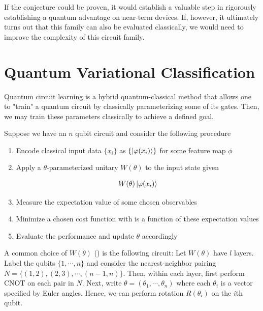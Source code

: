 \documentclass[main.tex]{subfiles}
\begin{document}
 If the conjecture could be proven, it would establish a valuable step in rigorously establishing a quantum advantage on near-term devices. If, however, it ultimately turns out that this family can also be evaluated classically, we would need to improve the complexity of this circuit family.
 
\section{Quantum Variational Classification}

Quantum circuit learning is a hybrid quantum-classical method that allows one to "train" a quantum circuit by classically parameterizing some of its gates. Then, we may train these parameters classically to achieve a defined goal. 

Suppose we have an $n$ qubit circuit and consider the following procedure

\begin{enumerate}
\item Encode classical input data $\{x_i \}$ as $\{\ket{\varphi(x_i)} \}$ for some feature map $\phi$
\item Apply a $\theta$-parameterized unitary $W(\theta)$ to the input state given

\begin{align*}
W(\theta)\ket{\varphi(x_i)}
\end{align*}

\item Measure the expectation value of some chosen observables

\item Minimize a chosen cost function with is a function of these expectation values

\item Evaluate the performance and update $\theta$ accordingly
\end{enumerate}

A common choice of $W(\theta)$ (\cite{havlicek2018supervised}) is the following circuit: Let $W(\theta)$ have $l$ layers. Label the qubits $\{1, \cdots, n\}$ and consider the nearest-neighbor pairing $N = \{(1,2), (2, 3), \cdots, (n-1, n)\}$. Then, within each layer, first perform CNOT on each pair in $N$. Next, write $\theta = (\theta_1, \cdots, \theta_n)$ where each $\theta_i$ is a vector specified by Euler angles. Hence, we can perform rotation $R(\theta_i)$ on the $i$th qubit.

%
%
%
\end{document}
